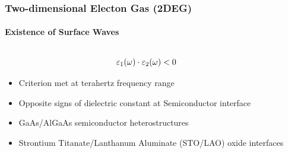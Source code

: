 \documentclass[mathserif,18pt,xcolor=table]{beamer}
\begin{document}
  \begin{frame}
    \frametitle{Two-dimensional Electon Gas (2DEG)}
    \framesubtitle{Existence of Surface Waves}
    \begin{columns} %
      \begin{column}[T]{.5\textwidth}
        \begin{equation} \nonumber
          \varepsilon_1(\omega) \cdot \varepsilon_2(\omega) < 0
          \label{eq:conditions}
        \end{equation}
        \begin{itemize}
          \item Criterion met at terahertz frequency range
          \item Opposite signs of dielectric constant at Semiconductor interface
          \item GaAs/AlGaAs semiconductor heterostructures
          \item Strontium Titanate/Lanthanum Aluminate (STO/LAO) oxide interfaces
        \end{itemize}
      \end{column}
      \begin{column}[T]{.5\textwidth}
        \end{column}%
      \end{columns}
    \end{frame}

    
\end{document}
